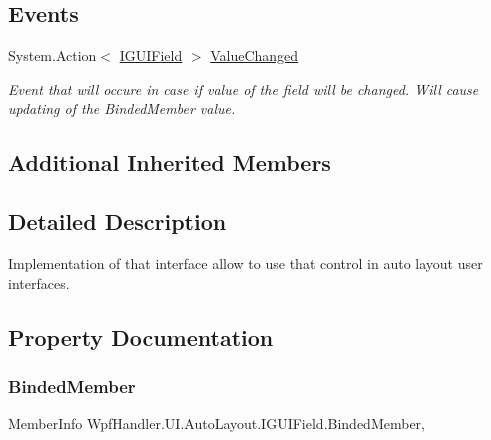 \subsection*{Events}
\begin{DoxyCompactItemize}
\item 
System.\+Action$<$ \mbox{\hyperlink{interface_wpf_handler_1_1_u_i_1_1_auto_layout_1_1_i_g_u_i_field}{I\+G\+U\+I\+Field}} $>$ \mbox{\hyperlink{interface_wpf_handler_1_1_u_i_1_1_auto_layout_1_1_i_g_u_i_field_a97d9c046f0ed12e42560f2c7fb414d5f}{Value\+Changed}}
\begin{DoxyCompactList}\small\item\em Event that will occure in case if value of the field will be changed. Will cause updating of the Binded\+Member value. \end{DoxyCompactList}\end{DoxyCompactItemize}
\subsection*{Additional Inherited Members}


\subsection{Detailed Description}
Implementation of that interface allow to use that control in auto layout user interfaces. 



\subsection{Property Documentation}
\mbox{\label{interface_wpf_handler_1_1_u_i_1_1_auto_layout_1_1_i_g_u_i_field_a063a35928be8b8f839f560d3c8af33e7}} 
\subsubsection{\texorpdfstring{Binded\+Member}{BindedMember}}
{\footnotesize\ttfamily Member\+Info Wpf\+Handler.\+U\+I.\+Auto\+Layout.\+I\+G\+U\+I\+Field.\+Binded\+Member\hspace{0.3cm}{\ttfamily [get]}, {\ttfamily [set]}}



